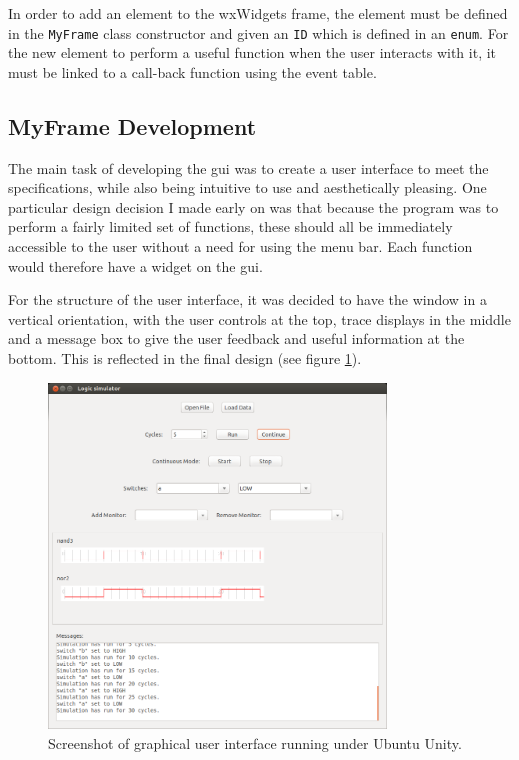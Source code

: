 \documentclass[a4paper,10pt]{article}  %
\begin{document}
In order to add an element to the wxWidgets frame, the element must be
defined in the \texttt{MyFrame} class constructor and given an
\texttt{ID} which is defined in an \texttt{enum}. For the new element
to perform a useful function when the user interacts with it, it must
be linked to a call-back function using the event table.

\subsection{MyFrame Development}

The main task of developing the gui was to create a user interface to
meet the specifications, while also being intuitive to use and
aesthetically pleasing. One particular design decision I made early on
was that because the program was to perform a fairly limited set of
functions, these should all be immediately accessible to the user
without a need for using the menu bar. Each function would therefore
have a widget on the gui.

For the structure of the user interface, it was decided to have the
window in a vertical orientation, with the user controls at the top,
trace displays in the middle and a message box to give the user
feedback and useful information at the bottom. This is reflected in
the final design (see figure \ref{fig:guiss}).
\begin{figure}[!htb]
  \begin{center}
    \includegraphics[width=0.8\textwidth]{GUI_Screenshot.png}
  \end{center}
  \caption{Screenshot of graphical user interface running under Ubuntu
  Unity.}
  \label{fig:guiss}
\end{figure}
\end{document}
